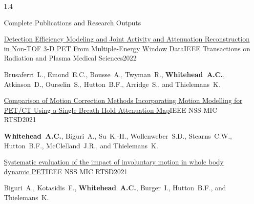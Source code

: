 \documentclass{cv}
\begin{document}
\begin{spacing}{1.4}
\begin{rSection}{Complete Publications and Research Outputs}
            \vspace{-0.5cm}
            \item \begin{rSubsection}{\href{https://doi.org/10.1109/TRPMS.2021.3064239}{Detection Efficiency Modeling and Joint Activity and Attenuation Reconstruction in Non-TOF 3-D PET From Multiple-Energy Window Data}}{}{IEEE Transactions on Radiation and Plasma Medical Sciences}{2022}
                \vspace{-0.25cm}
                \item Brusaferri~L., Emond~E.C., Bousse~A., Twyman~R., \textbf{Whitehead~A.C.}, Atkinson~D., Ourselin~S., Hutton~B.F., Arridge~S., and Thielemans~K.
                \\
            \end{rSubsection}
    
            \vspace{-0.5cm}
            \item \begin{rSubsection}{\href{https://doi.org/10.1109/NSS/MIC44867.2021.9875560}{Comparison of Motion Correction Methods Incorporating Motion Modelling for PET/CT Using a Single Breath Hold Attenuation Map}}{}{IEEE NSS MIC RTSD}{2021}
                \vspace{-0.25cm}
                \item \textbf{Whitehead~A.C.}, Biguri~A., Su~K.-H., Wollenweber~S.D., Stearns~C.W., Hutton~B.F., McClelland~J.R., and Thielemans~K.
                \\
            \end{rSubsection}
    
            \vspace{-0.5cm}
            \item \begin{rSubsection}{\href{https://doi.org/10.1109/NSS/MIC44867.2021.9875689}{Systematic evaluation of the impact of involuntary motion in whole body dynamic PET}}{}{IEEE NSS MIC RTSD}{2021}
                \vspace{-0.25cm}
                \item Biguri~A., Kotasidis~F., \textbf{Whitehead~A.C.}, Burger~I., Hutton~B.F., and Thielemans~K.
                \\
            \end{rSubsection}
    

\end{rSection}
\end{spacing}
\end{document}
